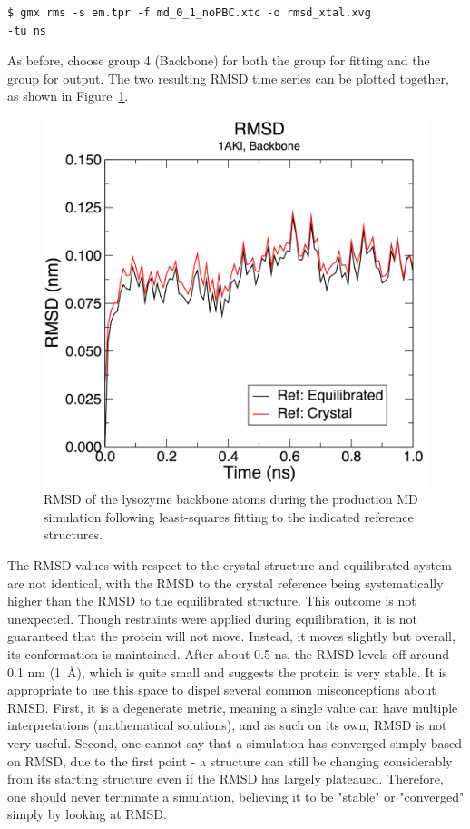 \documentclass[9pt,tutorial]{livecoms}
\begin{document}
\begin{verbatim}
$ gmx rms -s em.tpr -f md_0_1_noPBC.xtc -o rmsd_xtal.xvg 
-tu ns
\end{verbatim}

As before, choose group 4 (Backbone) for both the group for fitting and the group for output. The two resulting RMSD time series can be plotted together, as shown in Figure~\ref{lyso_md_rmsd_fig}.

\begin{figure}[h]
\centering
\includegraphics{plot_lyso_md_rmsd}
\caption{RMSD of the lysozyme backbone atoms during the production MD simulation following least-squares fitting to the indicated reference structures.}
\label{lyso_md_rmsd_fig}
\end{figure}

The RMSD values with respect to the crystal structure and equilibrated system are not identical, with the RMSD to the crystal reference being systematically higher than the RMSD to the equilibrated structure. This outcome is not unexpected. Though restraints were applied during equilibration, it is not guaranteed that the protein will not move. Instead, it moves slightly but overall, its conformation is maintained. After about 0.5 ns, the RMSD levels off around 0.1 nm (1~\AA), which is quite small and suggests the protein is very stable. It is appropriate to use this space to dispel several common misconceptions about RMSD. First, it is a degenerate metric, meaning a single value can have multiple interpretations (mathematical solutions), and as such on its own, RMSD is not very useful. Second, one cannot say that a simulation has converged simply based on RMSD, due to the first point - a structure can still be changing considerably from its starting structure even if the RMSD has largely plateaued. Therefore, one should never terminate a simulation, believing it to be "stable" or "converged" simply by looking at RMSD.
\end{document}
